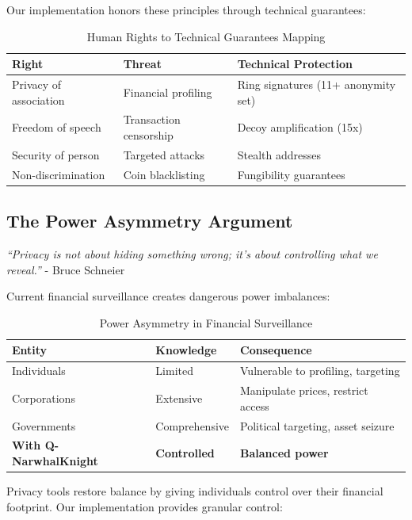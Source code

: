 \documentclass[12pt,a4paper]{article}
\begin{document}
Our implementation honors these principles through technical guarantees:

\begin{table}[h]
\centering
\begin{tabular}{lll}
\toprule
\textbf{Right} & \textbf{Threat} & \textbf{Technical Protection} \\
\midrule
Privacy of association & Financial profiling & Ring signatures (11+ anonymity set) \\
Freedom of speech & Transaction censorship & Decoy amplification (15x) \\
Security of person & Targeted attacks & Stealth addresses \\
Non-discrimination & Coin blacklisting & Fungibility guarantees \\
\bottomrule
\end{tabular}
\caption{Human Rights to Technical Guarantees Mapping}
\end{table}

\subsection{The Power Asymmetry Argument}

\textit{``Privacy is not about hiding something wrong; it's about controlling what we reveal.''} - Bruce Schneier

Current financial surveillance creates dangerous power imbalances:

\begin{table}[h]
\centering
\begin{tabular}{lll}
\toprule
\textbf{Entity} & \textbf{Knowledge} & \textbf{Consequence} \\
\midrule
Individuals & Limited & Vulnerable to profiling, targeting \\
Corporations & Extensive & Manipulate prices, restrict access \\
Governments & Comprehensive & Political targeting, asset seizure \\
\textbf{With Q-NarwhalKnight} & \textbf{Controlled} & \textbf{Balanced power} \\
\bottomrule
\end{tabular}
\caption{Power Asymmetry in Financial Surveillance}
\end{table}

Privacy tools restore balance by giving individuals control over their financial footprint. Our implementation provides granular control:
\end{document}
